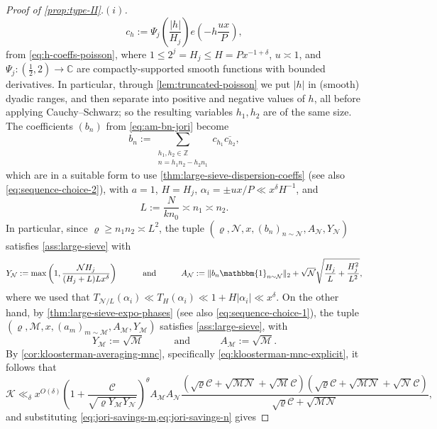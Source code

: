 \documentclass[reqno,11pt]{amsart}
\theoremstyle{remark}
\numberwithin{equation}{section}
\newcommand{\Z}{\mathbb{Z}}
\newcommand{\C}{\mathbb{C}}
\newcommand{\MM}{\mathcal{M}}
\newcommand{\NN}{\mathcal{N}}
\newcommand{\CC}{\mathcal{C}}
\newcommand{\mK}{\mathcal{K}}
\newcommand{\one}{\mathbbm{1}}
\renewcommand{\bar}{\overline}
\begin{document}
\begin{proof}[Proof of \cref{prop:type-II}.$(i)$]
\[
    c_h := \Psi_j\left(\frac{|h|}{H_j}\right) e\left(-h\frac{ux}{P}\right),
\]
from \cref{eq:h-coeffs-poisson}, where $1 \le 2^j = H_j \le H = P x^{-1+\delta}$, $u \asymp 1$, and $\Psi_j : (\frac{1}{2}, 2) \to \C$ are compactly-supported smooth functions with bounded derivatives. In particular, through \cref{lem:truncated-poisson} we put $|h|$ in (smooth) dyadic ranges, and then separate into positive and negative values of $h$, all before applying Cauchy--Schwarz; so the resulting variables $h_1, h_2$ are of the same size. The coefficients $(b_n)$ from \cref{eq:am-bn-jori} become
\[
    b_n := \sum_{\substack{h_1, h_2 \in \Z \\ n = h_1 n_2 - h_2 n_1}} c_{h_1} \bar{c_{h_2}},
\]
which are in a suitable form to use \cref{thm:large-sieve-dispersion-coeffs} (see also \cref{eq:sequence-choice-2}), with $a = 1$, $H = H_j$, $\alpha_i = \pm ux/P \ll x^\delta H^{-1}$, and 
\begin{equation} \label{eq:L-value}
    L := \frac{N}{k n_0} \asymp n_1 \asymp n_2.
\end{equation}
In particular, since $\varrho \ge n_1 n_2 \asymp L^2$, the tuple $(\varrho, \NN, x, (b_n)_{n \sim \NN}, A_{\NN}, Y_{\NN})$ satisfies \cref{ass:large-sieve} with
\begin{equation} \label{eq:jori-savings-n}
    Y_{\NN} := \max\left(1, \frac{\NN H_j}{(H_j+L)L x^\delta} \right)
    \qquad\quad 
    \text{and}
    \qquad\quad
    A_{\NN} := \|b_n \one_{n \sim \NN}\|_2 + \sqrt{\NN}\sqrt{\frac{H_j}{L} + \frac{H_j^2}{L^2}},
\end{equation}
where we used that $T_{\NN/L}(\alpha_i) \ll T_H(\alpha_i) \ll 1 + H |\alpha_i| \ll x^\delta$. On the other hand, by \cref{thm:large-sieve-expo-phases} (see also \cref{eq:sequence-choice-1}), the tuple $(\varrho, \MM, x, (a_m)_{m \sim \MM}, A_{\MM}, Y_{\MM})$ satisfies \cref{ass:large-sieve}, with
\begin{equation} \label{eq:jori-savings-m}
    Y_{\MM} := \sqrt{\MM} 
    \qquad\quad 
    \text{and}
    \qquad\quad
    A_{\MM} := \sqrt{\MM}.
\end{equation}
By \cref{cor:kloosterman-averaging-mnc}, specifically \cref{eq:kloosterman-mnc-explicit}, it follows that
\[
    \mK \ll_\delta x^{O(\delta)} 
    \left(1 + \frac{\CC}{\sqrt{\varrho Y_{\MM} Y_{\NN}}} \right)^\theta
    A_{\MM} A_{\NN}
    \frac{\left(\sqrt{\varrho}\CC + \sqrt{\MM\NN} + \sqrt{\MM} \CC\right)\left(\sqrt{\varrho}\CC + \sqrt{\MM \NN} + \sqrt{\NN} \CC\right)}{\sqrt{\varrho}\CC + \sqrt{\MM \NN}},
\]
and substituting \cref{eq:jori-savings-m,eq:jori-savings-n} gives

\end{proof}
\end{document}

